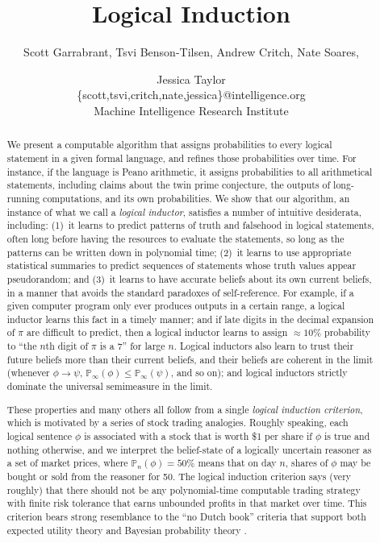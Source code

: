 \documentclass[authordate,onecolumn,noenvironments]{miri-tech-article}
\title{Logical Induction}
\author{
  Scott Garrabrant, Tsvi Benson-Tilsen, Andrew Critch, Nate Soares, \and Jessica Taylor\\
  \{scott,tsvi,critch,nate,jessica\}@intelligence.org\\
  Machine Intelligence Research Institute
}
\numberwithin{equation}{subsection}
\renewcommand{\implies}{\rightarrow}
\newcommand{\nn}{n}
\newcommand{\BelState}{\mathbb{P}}
\newcommand{\pt}{\BelState}
\begin{document}

\maketitle


\begin{abstract}
  We present a computable algorithm that assigns probabilities to every logical statement in a given formal language, and refines those probabilities over time. For instance, if the language is Peano arithmetic, it assigns probabilities to all arithmetical statements, including claims about the twin prime conjecture, the outputs of long-running computations, and its own probabilities. We show that our algorithm, an instance of what we call a \emph{logical inductor}, satisfies a number of intuitive desiderata, including: (1)~it learns to predict patterns of truth and falsehood in logical statements, often long before having the resources to evaluate the statements, so long as the patterns can be written down in polynomial time; (2)~it learns to use appropriate statistical summaries to predict sequences of statements whose truth values appear pseudorandom; and (3)~it learns to have accurate beliefs about its own current beliefs, in a manner that avoids the standard paradoxes of self-reference. For example, if a given computer program only ever produces outputs in a certain range, a logical inductor learns this fact in a timely manner; and if late digits in the decimal expansion of $\pi$ are difficult to predict, then a logical inductor learns to assign $\approx 10\%$ probability to ``the $n$th digit of $\pi$ is a 7'' for large $n$. Logical inductors also learn to trust their future beliefs more than their current beliefs, and their beliefs are coherent in the limit (whenever $\phi \implies \psi$, $\pt_\infty(\phi) \le \pt_\infty(\psi)$, and so on); and logical inductors strictly dominate the universal semimeasure in the limit.

  These properties and many others all follow from a single \emph{logical induction criterion}, which is motivated by a series of stock trading analogies. Roughly speaking, each logical sentence $\phi$ is associated with a stock that is worth \$1 per share if $\phi$ is true and nothing otherwise, and we interpret the belief-state of a logically uncertain reasoner as a set of market prices, where $\pt_\nn(\phi)=50\%$ means that on day $\nn$, shares of $\phi$ may be bought or sold from the reasoner for 50\textcent{}. The logical induction criterion says (very roughly) that there should not be any polynomial-time computable trading strategy with finite risk tolerance that earns unbounded profits in that market over time. This criterion bears strong resemblance to the ``no Dutch book'' criteria that support both expected utility theory \citep{Von-Neumann:1944} and Bayesian probability theory \citep{Ramsey:1931,DeFinetti:1937:foresight}.
\end{abstract}
\end{document}
